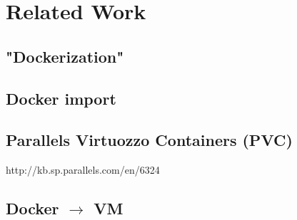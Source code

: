 \chapter{Related Work}


\section{"Dockerization"}


\section{Docker import}
\section{Parallels Virtuozzo Containers (PVC)}
http://kb.sp.parallels.com/en/6324

\section{Docker $\to$ VM}